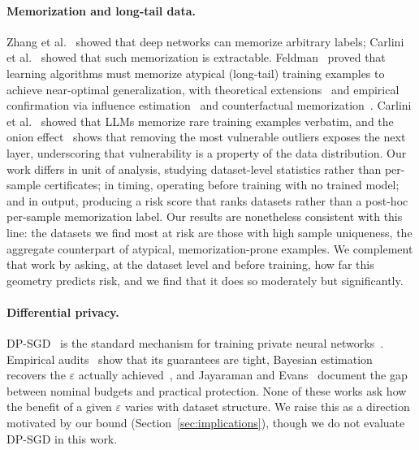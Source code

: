 \paragraph{Memorization and long-tail data.}
Zhang et al.~\cite{zhang2017understanding} showed that deep networks can
memorize arbitrary labels; Carlini et al.~\cite{carlini2019secret}
showed that such memorization is extractable.
Feldman~\cite{feldman2020memorization} proved that learning algorithms
must memorize atypical (long-tail) training examples to achieve
near-optimal generalization, with theoretical
extensions~\cite{brown2021memorization} and empirical confirmation via
influence estimation~\cite{feldman2020neural} and counterfactual
memorization~\cite{zhang2021counterfactual}.
Carlini et al.~\cite{carlini2021extracting} showed that LLMs memorize
rare training examples verbatim, and the onion
effect~\cite{carlini2022onion} shows that removing the most vulnerable
outliers exposes the next layer, underscoring that vulnerability is a
property of the data distribution.
Our work differs in unit of analysis, studying dataset-level statistics
rather than per-sample certificates; in timing, operating before
training with no trained model; and in output, producing a risk score
that ranks datasets rather than a post-hoc per-sample memorization
label. Our results are nonetheless consistent with this line: the
datasets we find most at risk are those with high sample uniqueness, the
aggregate counterpart of atypical, memorization-prone examples. We
complement that work by asking, at the dataset level and before
training, how far this geometry predicts risk, and we find that it does
so moderately but significantly.

\paragraph{Differential privacy.}
DP-SGD~\cite{abadi2016deep} is the standard mechanism for training
private neural networks~\cite{dwork2014algorithmic}.
Empirical audits~\cite{jagielski2020auditing,nasr2021adversary,steinke2023privacy}
show that its guarantees are tight, Bayesian estimation recovers the
$\varepsilon$ actually achieved~\cite{zanella2023bayesian}, and
Jayaraman and Evans~\cite{jayaraman2019evaluating} document the gap
between nominal budgets and practical protection.
None of these works ask how the benefit of a given $\varepsilon$
varies with dataset structure. We raise this as a direction motivated by
our bound (Section~\ref{sec:implications}), though we do not evaluate
DP-SGD in this work.

